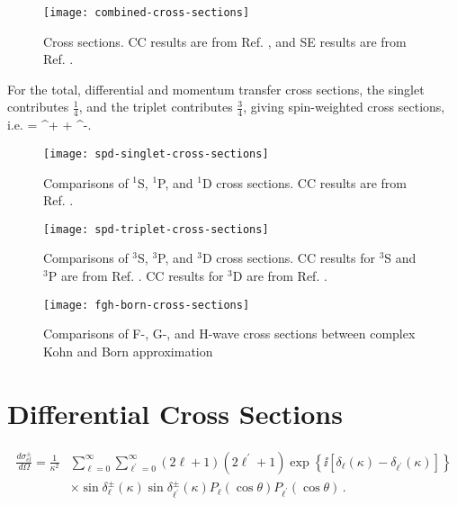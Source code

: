 \documentclass[Dissertation.tex]{subfiles}
\begin{document}
\begin{figure}[H]
	\centering
	\texttt{[image: combined-cross-sections]}
	\caption[Cross sections.]{Cross sections. CC results are from Ref. \cite{Walters2004}, and SE results are from Ref. \cite{Hara1975}.}
	\label{fig:combined-cross-sections}
\end{figure}


For the total, differential and momentum transfer cross sections, the singlet contributes $\frac{1}{4}$, and the triplet contributes $\frac{3}{4}$, giving spin-weighted cross sections, i.e. \cite{Ward1987}
\beq
\label{eq:SpinWeightCS}
\sigma =  \sigma^+ +  \sigma^-.
\eeq


\label{sec:crosscompare}
\begin{figure}[H]
	\centering
	\texttt{[image: spd-singlet-cross-sections]}
	\caption[Comparisons of $^1$S, $^1$P, and $^1$D cross sections.]{Comparisons of $^1$S, $^1$P, and $^1$D cross sections. CC results are from Ref. \cite{Walters2004}.}
	\label{fig:spd-singlet-cross-sections}
\end{figure}

\begin{figure}[H]
	\centering
	\texttt{[image: spd-triplet-cross-sections]}
	\caption[Comparisons of $^3$S, $^3$P, and $^3$D cross sections.]{Comparisons of $^3$S, $^3$P, and $^3$D cross sections. CC results for $^3$S and $^3$P are from Ref. \cite{Walters2004}. CC results for $^3$D are from Ref. \cite{Blackwood2002}.}
	\label{fig:spd-triplet-cross-sections}
\end{figure}


\begin{figure}[H]
	\centering
	\texttt{[image: fgh-born-cross-sections]}
	\caption{Comparisons of F-, G-, and H-wave cross sections between complex Kohn and Born approximation}
	\label{fig:fgh-born-cross-sections}
\end{figure}


\section{Differential Cross Sections}
\label{sec:diffcross}


\begin{align}
\label{eq:DiffCross}
\nonumber \frac{d\sigma_{el}^\pm}{d\Omega} = \frac{1}{\kappa^2} & \sum_{\ell=0}^\infty \sum_{\ell^\prime=0}^\infty (2\ell+1)(2\ell^\prime+1) \exp\left\{\ii \left[\delta_\ell(\kappa) - \delta_{\ell^\prime}(\kappa) \right] \right\} \\
& \times \sin\delta_\ell^\pm(\kappa) \sin\delta_{\ell^\prime}^\pm(\kappa) P_\ell(\cos\theta) P_{\ell^\prime}(\cos\theta)\,.
\end{align}
\end{document}
